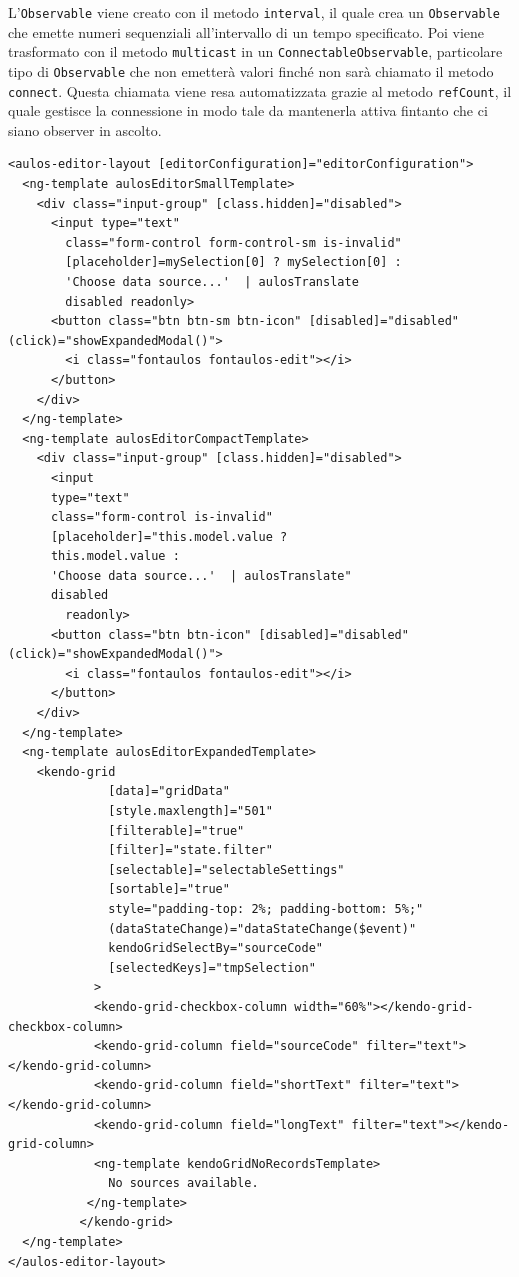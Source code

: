 L'\verb|Observable| viene creato con il metodo \verb|interval|, il quale crea un \verb|Observable| che emette numeri sequenziali all'intervallo di un tempo specificato. Poi viene trasformato con il metodo \verb|multicast| in un \verb|ConnectableObservable|, particolare tipo di \verb|Observable| che non emetterà valori finché non sarà chiamato il metodo \verb|connect|. Questa chiamata viene resa automatizzata grazie al metodo \verb|refCount|, il quale gestisce la connessione in modo tale da mantenerla attiva fintanto che ci siano observer in ascolto.

\begin{lstlisting}[caption={Classe RefreshService}, style=html]
<aulos-editor-layout [editorConfiguration]="editorConfiguration">
  <ng-template aulosEditorSmallTemplate>
    <div class="input-group" [class.hidden]="disabled">
      <input type="text" 
        class="form-control form-control-sm is-invalid"
        [placeholder]=mySelection[0] ? mySelection[0] : 
        'Choose data source...'  | aulosTranslate 
        disabled readonly>
      <button class="btn btn-sm btn-icon" [disabled]="disabled" (click)="showExpandedModal()">
        <i class="fontaulos fontaulos-edit"></i>
      </button>
    </div>
  </ng-template>
  <ng-template aulosEditorCompactTemplate>
    <div class="input-group" [class.hidden]="disabled">
      <input 
      type="text" 
      class="form-control is-invalid" 
      [placeholder]="this.model.value ? 
      this.model.value : 
      'Choose data source...'  | aulosTranslate" 
      disabled
        readonly>
      <button class="btn btn-icon" [disabled]="disabled" (click)="showExpandedModal()">
        <i class="fontaulos fontaulos-edit"></i>
      </button>
    </div>
  </ng-template>
  <ng-template aulosEditorExpandedTemplate>
    <kendo-grid
              [data]="gridData"
              [style.maxlength]="501"
              [filterable]="true"
              [filter]="state.filter"
              [selectable]="selectableSettings"
              [sortable]="true"
              style="padding-top: 2%; padding-bottom: 5%;"
              (dataStateChange)="dataStateChange($event)"
              kendoGridSelectBy="sourceCode"
              [selectedKeys]="tmpSelection"
            >
            <kendo-grid-checkbox-column width="60%"></kendo-grid-checkbox-column>
            <kendo-grid-column field="sourceCode" filter="text"></kendo-grid-column>
            <kendo-grid-column field="shortText" filter="text"></kendo-grid-column>
            <kendo-grid-column field="longText" filter="text"></kendo-grid-column>
            <ng-template kendoGridNoRecordsTemplate>
              No sources available.
           </ng-template>
          </kendo-grid>
  </ng-template>
</aulos-editor-layout>
\end{lstlisting}